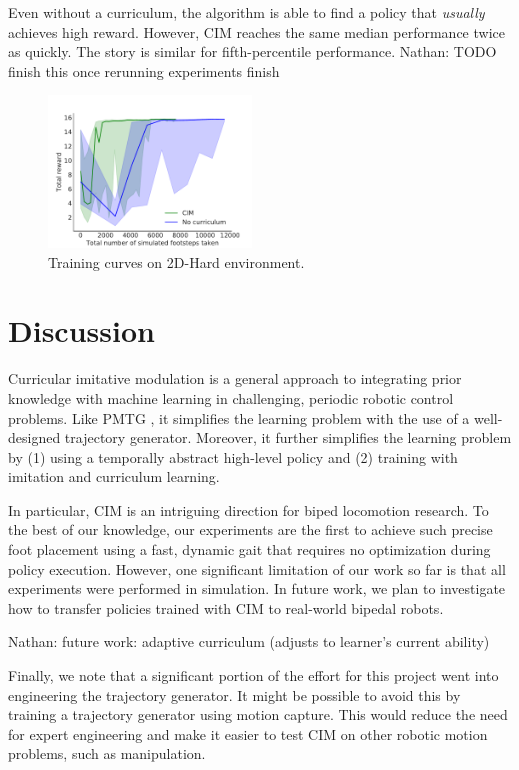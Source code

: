 \documentclass[conference]{IEEEtran}
\newcommand{\nhatch}[1]{{\leavevmode\color{magenta} Nathan: #1}}
\begin{document}
Even without a curriculum, the algorithm is able to find a policy that \emph{usually} achieves high reward.
However, CIM reaches the same median performance twice as quickly.
The story is similar for fifth-percentile performance.
\nhatch{TODO finish this once rerunning experiments finish}

\begin{figure}
  \includegraphics[width=0.48\textwidth]{../figures/nocur_baseline.pdf}
  \caption{\label{fig:nocur baseline} Training curves on 2D-Hard environment.}
\end{figure}

\section{Discussion}

Curricular imitative modulation is a general approach to integrating prior knowledge with machine learning in challenging, periodic robotic control problems.
Like PMTG \citep{iscen2018pmtg}, it simplifies the learning problem with the use of a well-designed trajectory generator.
Moreover, it further simplifies the learning problem by (1) using a temporally abstract high-level policy and (2) training with imitation and curriculum learning.

In particular, CIM is an intriguing direction for biped locomotion research.
To the best of our knowledge, our experiments are the first to achieve such precise foot placement
using a fast, dynamic gait that requires no optimization during policy execution.
However, one significant limitation of our work so far is that all experiments were performed in simulation.
In future work, we plan to investigate how to transfer policies trained with CIM to real-world bipedal robots.

\nhatch{future work: adaptive curriculum (adjusts to learner's current ability)}

Finally, we note that a significant portion of the effort for this project went into engineering the trajectory generator.
It might be possible to avoid this by training a trajectory generator using motion capture.
This would reduce the need for expert engineering and make it easier to test CIM on other robotic motion problems, such as manipulation.
\end{document}
